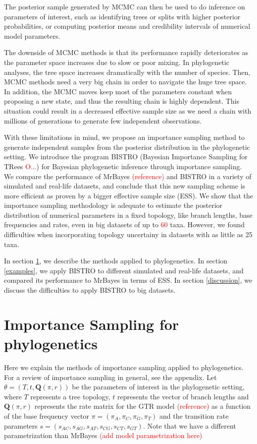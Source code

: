 \documentclass[useAMS,usenatbib]{biom}
\newcommand{\falta}[1]{\textcolor{red}{#1}}
\begin{document}
The posterior sample generated by MCMC can then be used to do
inference on parameters of interest, such as identifying trees or
splits with higher posterior probabilities, or computing posterior
means and credibility intervals of numerical model parameters.

The downside of MCMC methods is that its performance rapidly
deteriorates as the parameter space increases due to slow or poor
mixing. In phylogenetic analyses, the tree space increases
dramatically with the number of species. Then, MCMC methods need a
very big chain in order to navigate the huge tree space. In addition,
the MCMC moves keep most of the parameters constant when proposing a
new state, and thus the resulting chain is highly dependent. This
situation could result in a decreased effective sample size as we need
a chain with millions of generations to generate few independent
observations.

With these limitations in mind, we propose an importance sampling
method to generate independent samples from the posterior distribution
in the phylogenetic setting. We introduce the program BISTRO (Bayesian
Importance Sampling for TRees \falta{O...}) for Bayesian phylogenetic
inference through importance sampling. We compare the performance of
MrBayes \falta{(reference)} and BISTRO in a variety of simulated and
real-life datasets, and conclude that this new sampling scheme is more
efficient as proven by a bigger effective sample size (ESS). We show
that the importance sampling methodology is adequate to estimate the
posterior distribution of numerical parameters in a fixed topology,
like branch lengths, base frequencies and rates, even in big datasets
of up to \falta{60} taxa.  However, we found difficulties when
incorporating topology uncertainy in datasets with as little as 25
taxa.

In section \ref{phyloIS}, we describe the methods applied to
phylogenetics. In section \ref{examples}, we apply BISTRO to different
simulated and real-life datasets, and compared its performance to
MrBayes in terms of ESS. In section \ref{discussion}, we discuss the
difficulties to apply BISTRO to big datasets.



\section[]{Importance Sampling for phylogenetics}
\label{phyloIS}
Here we explain the methods of importance sampling applied to
phylogenetics. For a review of importance sampling in general, see the
appendix.  Let $\theta = (T, t, \mathbf{Q}(\pi,r))$ be the parameters
of interest in the phylogenetic setting, where $T$ represents a tree
topology, $t$ represents the vector of branch lengths and
$\mathbf{Q}(\pi,r)$ represents the rate matrix for the GTR model
\falta{(reference)} as a function of the base frequency vector $\pi =
(\pi_A, \pi_C, \pi_G, \pi_T)$ and the transition rate parameters $s =
(s_{AC}, s_{AG}, s_{AT}, s_{CG}, s_{CT}, s_{GT})$. Note that we have a
different parametrization than MrBayes \falta{(add model
  parametrization here)} 
\end{document}
